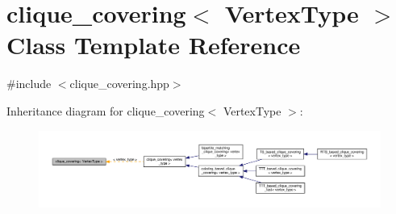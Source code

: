 \hypertarget{classclique__covering}{}\section{clique\+\_\+covering$<$ Vertex\+Type $>$ Class Template Reference}
\label{classclique__covering}


{\ttfamily \#include $<$clique\+\_\+covering.\+hpp$>$}



Inheritance diagram for clique\+\_\+covering$<$ Vertex\+Type $>$\+:
\nopagebreak
\begin{figure}[H]
\begin{center}
\leavevmode
\includegraphics[width=350pt]{da/dcd/classclique__covering__inherit__graph}
\end{center}
\end{figure}
